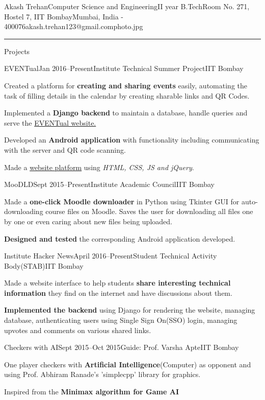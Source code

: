 \documentclass{resume_ssl}
\begin{document}
\begin{Header}{Akash Trehan}{Computer Science and Engineering}{II year B.Tech}{Room No. 271, Hostel 7, IIT Bombay}{Mumbai, India - 400076}{akash.trehan123@gmail.com}{photo.jpg}
\end{Header}

\rule{\textwidth}{1pt}

\begin{Section}{Projects}
\begin{Subsection}{EVENTual}{Jan 2016--Present}{Institute Technical Summer Project}{IIT Bombay}{
\item {Created a platform for \textbf{creating and sharing events} easily, automating the task of filling details in the calendar by creating sharable links and QR Codes.}
\item {Implemented a \textbf{Django backend} to maintain a database, handle queries and serve the
\href{http://www.eventual.co.in}{EVENTual website.}}
\item {Developed an \textbf{Android application} with functionality including communicating with the server and QR code scanning.}
\item {Made a \href{http://www.eventual.co.in}{website platform} using \textit{HTML, CSS, JS and jQuery}.}
}
\end{Subsection}

\begin{Subsection}{MooDLD}{Sept 2015--Present}{Institute Academic Council}{IIT Bombay}{
\item {Made a \textbf{one-click Moodle downloader} in Python using Tkinter GUI for auto-downloading course files on Moodle. Saves the user for downloading all files one by one or even caring about new files being uploaded.}
\item {\textbf{Designed and tested} the corresponding Android application developed.}
}
\end{Subsection}

\begin{Subsection}{Institute Hacker News}{April 2016--Present}{Student Technical Activity Body(STAB)}{IIT Bombay}{
\item {Made a website interface to help students \textbf{share interesting technical information} they find on the internet and have discussions about them.}
\item {\textbf{Implemented the backend} using Django for rendering the website, managing database, authenticating users using Single Sign On(SSO) login, managing upvotes and comments on various shared links.}
}
\end{Subsection}

\begin{Subsection}{Checkers with AI}{Sept 2015--Oct 2015}{Guide: Prof. Varsha Apte}{IIT Bombay}{
\item {One player checkers with \textbf{Artificial Intelligence}(Computer) as opponent and using Prof. Abhiram Ranade's 'simplecpp' library for graphics.}
\item {Inspired from the \textbf{Minimax algorithm for Game AI}}
}
\end{Subsection}

\end{Section}
\end{document}
